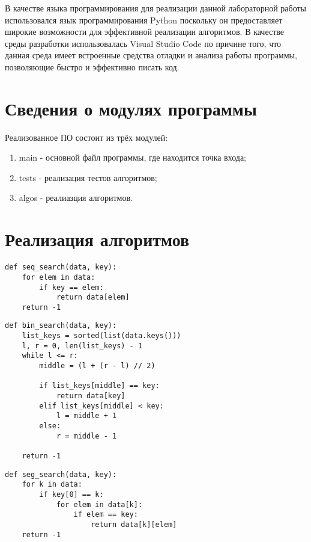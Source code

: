 В качестве языка программирования для реализации данной лабораторной работы использовался язык программирования Python поскольку он предоставляет широкие возможности для эффективной реализации алгоритмов. В качестве среды разработки использовалась Visual Studio Code по причине того, что данная среда имеет встроенные средства отладки и анализа работы программы, позволяющие быстро и эффективно писать код.

\section{Сведения о модулях программы}

Реализованное ПО состоит из трёх модулей:
\begin{enumerate}
	\item main - основной файл программы, где находится точка входа;
	\item tests - реализация тестов алгоритмов;
	\item algos - реалиазция алгоритмов.
\end{enumerate}

\section{Реализация алгоритмов}

\begin{lstlisting}[label=some-code-1,caption=Реализация алгоритма полного перебора]
def seq_search(data, key):
    for elem in data:
        if key == elem:
            return data[elem]
    return -1
\end{lstlisting}

\begin{lstlisting}[label=some-code-2,caption=Реализация алгоритма бинарного поиска]
def bin_search(data, key):
    list_keys = sorted(list(data.keys()))
    l, r = 0, len(list_keys) - 1
    while l <= r:
        middle = (l + (r - l) // 2)

        if list_keys[middle] == key:
            return data[key]
        elif list_keys[middle] < key:
            l = middle + 1
        else:
            r = middle - 1

    return -1
\end{lstlisting}

\begin{lstlisting}[label=some-code-3,caption=Реализация алгоритма частичного анализа]
def seg_search(data, key):
    for k in data:
        if key[0] == k:
            for elem in data[k]:
                if elem == key:
                    return data[k][elem]
    return -1
\end{lstlisting}

